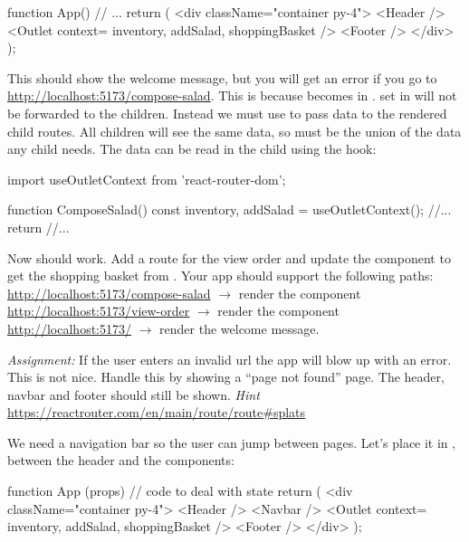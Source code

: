 \documentclass[fleqn, article, a4paper]{memoir}
\begin{document}
\begin{Assignments}
\begin{Code}
function App() {
  // ...
  return (
    <div className="container py-4">
      <Header />
      <Outlet context={{ inventory, addSalad, shoppingBasket }} />
      <Footer />
    </div>
  );
}
\end{Code}
\noindent This should show the welcome message, but you will get an error if you go to \url{http://localhost:5173/compose-salad}. This is because  becomes  in .  set in  will not be forwarded to the children. Instead we must use  to pass data to the rendered child routes. All children will see the same data, so  must be the union of the data any child needs. The data can be read in the child using the  hook:
\begin{Code}
import { useOutletContext } from 'react-router-dom';

function ComposeSalad() {
  const { inventory, addSalad } = useOutletContext();
  //...
  return //...
}
\end{Code}
Now  should work. Add a route for the view order and update the component to get the shopping basket from . Your app should support the following paths:
\\ \url{http://localhost:5173/compose-salad} $\rightarrow$ render the  component
\\ \url{http://localhost:5173/view-order} $\rightarrow$ render the  component
\\ \url{http://localhost:5173/} $\rightarrow$ render the welcome message.

\emph{Assignment:} If the user enters an invalid url the app will blow up with an error. This is not nice. Handle this by showing a ``page not found'' page. The header, navbar and footer should still be shown. \emph{Hint} \url{https://reactrouter.com/en/main/route/route#splats}

\item We need a navigation bar so the user can jump between pages. Let's place it in , between the header and the  components:

\begin{Code}
function App (props) {
  // code to deal with state
  return (
    <div className="container py-4">
        <Header />
        <Navbar />
        <Outlet context={{ inventory, addSalad, shoppingBasket }} />
        <Footer />
    </div>
  );
}
\end{Code}


\end{Assignments}
\end{document}
